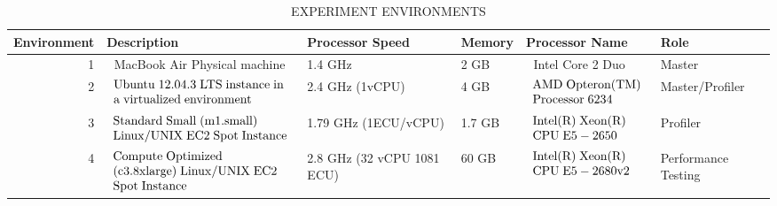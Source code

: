 \documentclass[journal]{IEEEtran}
\begin{document}
\begin{table*}[!htp]
\begin{center}\caption{EXPERIMENT ENVIRONMENTS } \label{table:experiment_env}
\begin{tabular}{|r|l|l|l|l|l|}
\hline
\textbf{Environment}&  \textbf{Description } &  \textbf{Processor Speed }&  \textbf{Memory }&  \textbf{Processor Name }&  \textbf{Role }\\
\hline 1 &  $\;$ MacBook Air Physical machine &    1.4 GHz &  2 GB &  $\;$ Intel Core 2 Duo & Master  \\
\hline 2 & $\begin{array}{l}
    {\rm{Ubuntu}}\;{\rm{12}}{\rm{.04}}{\rm{.3}}\;{\rm{LTS}}\;{\rm{instance}}\;{\rm{in }}\\
    {\rm{a}}\;{\rm{virtualized}}\;{\rm{environment}}
    \end{array}$ &  
    2.4 GHz (1vCPU) 
     &  4 GB& $\begin{array}{l}
    {\rm{AMD}}\;{\rm{Opteron(TM) }}\\
    {\rm{Processor}}\;{\rm{6234}}
    \end{array}$ & Master/Profiler\\
\hline 3 & $\begin{array}{l}
    {\rm{Standard}}\;{\rm{Small}}\;{\rm{(m1}}{\rm{.small) }}\\
    {\rm{Linux/UNIX}}\;{\rm{EC2}}\;{\rm{Spot}}\;{\rm{Instance}}
    \end{array}$ &  
    1.79 GHz (1ECU/vCPU) 
     & 1.7 GB & $\begin{array}{l}
    {\rm{Intel(R)}}\;{\rm{Xeon(R) }}\\
    {\rm{CPU}}\;{\rm{E5 - 2650}}\;
    \end{array}$ & Profiler\\
\hline 4 &  $\begin{array}{l}
    {\rm{Compute}}\;{\rm{Optimized}}\\
    {\rm{(c3}}{\rm{.8xlarge)}}\;{\rm{Linux/UNIX}}\;{\rm{EC2}}\\
    {\rm{Spot}}\;{\rm{Instance }}
    \end{array}$&  
 2.8 GHz (32 vCPU 1081 ECU)
     & 60 GB & $\begin{array}{l}
    {\rm{Intel(R)}}\;{\rm{Xeon(R) }}\\
    {\rm{CPU}}\;{\rm{E5 - 2680 v2}}
    \end{array}$ & Performance Testing \\

\hline
\end{tabular}
\end{center}
\end{table*}
\end{document}
